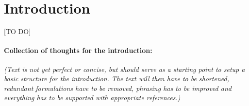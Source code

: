 \documentclass[12pt,preprint]{aastex}
\begin{document}
\tableofcontents

\section{Introduction}

[TO DO]

\paragraph{Collection of thoughts for the introduction:} \textit{(Text is not yet perfect or concise, but should serve as a starting point to setup a basic structure for the introduction. The text will then have to be shortened, redundant formulations have to be removed, phrasing has to be improved and everything has to be supported with appropriate references.)}
\end{document}
